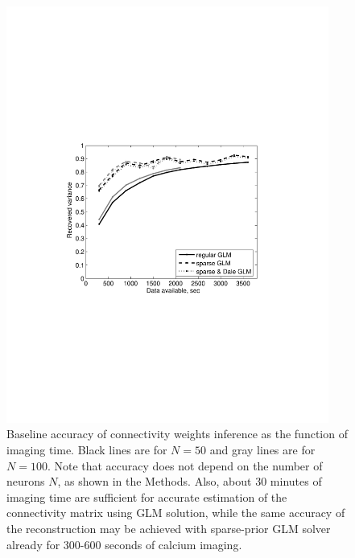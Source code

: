 \begin{figure}
\includegraphics[width=300pt]{../figs/Figure4_perf_vs_T}
\caption{Baseline accuracy of connectivity weights inference as the function of imaging time. Black lines are for $N=50$ and gray lines are for $N=100$. Note that accuracy does not depend on the number of neurons $N$, as shown in the Methods. Also, about 30 minutes of imaging time are sufficient for accurate estimation of the connectivity matrix using GLM solution, while the same accuracy of the reconstruction may be achieved with sparse-prior GLM solver already for 300-600 seconds of calcium imaging.}
\label{fig:data-time}
\end{figure}

